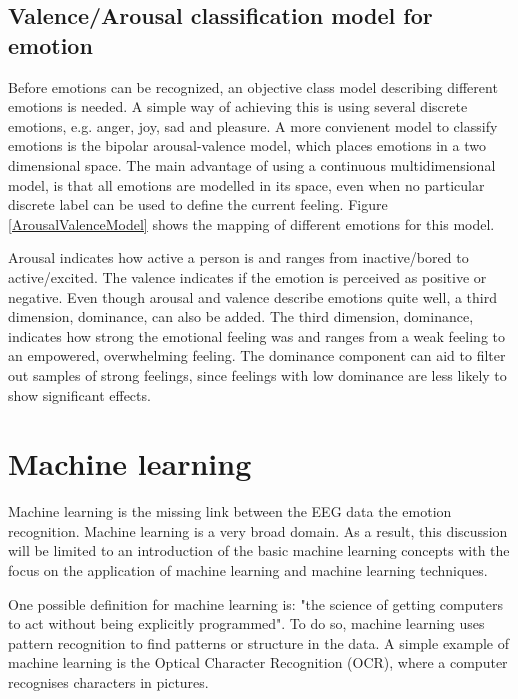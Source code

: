 \subsection{Valence/Arousal classification model for emotion}
\label{valarrdomspace}

Before emotions can be recognized, an objective class model describing different emotions is needed. A simple way of achieving this is using several discrete emotions, e.g. anger, joy, sad and pleasure. A more convienent model to classify emotions is the bipolar arousal-valence model\cite{ExtendedPaper,RealTimeEEGEmotion}, which places emotions in a two dimensional space. The main advantage of using a continuous multidimensional model, is that all emotions are modelled in its space, even when no particular discrete label can be used to define the current feeling. Figure \ref{ArousalValenceModel} shows the mapping of different emotions for this model. 

\npar

 Arousal indicates how active a person is and ranges from inactive/bored to active/excited. The valence indicates if the emotion is perceived as positive or negative. Even though arousal and valence describe emotions quite well, a third dimension, dominance, can also be added. The third dimension, dominance, indicates how strong the emotional feeling was and ranges from a weak feeling to an empowered, overwhelming feeling. The dominance component can aid to filter out samples of strong feelings, since feelings with low dominance are less likely to show significant effects.


\section{Machine learning}
Machine learning is the missing link between the EEG data the emotion recognition. Machine learning is a very broad domain. As a result, this discussion will be limited to an introduction of the basic machine learning concepts with the focus on the application of machine learning and machine learning techniques. 

\npar

One possible definition for machine learning is: "the science of getting computers to act without being explicitly programmed"\citep{MLDef}. To do so, machine learning uses pattern recognition to find patterns or structure in the data. A simple example of machine learning is the Optical Character Recognition (OCR), where a computer recognises characters in pictures\citep{OCR}.

